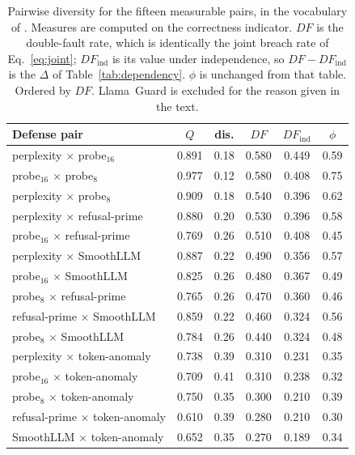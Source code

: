 \begin{table}[t]
\centering
\caption{Pairwise diversity for the fifteen measurable pairs, in the vocabulary of
\citet{kuncheva2003measures}. Measures are computed on the correctness indicator. $DF$ is
the double-fault rate, which is identically the joint breach rate of Eq.~\eqref{eq:joint};
$DF_{\mathrm{ind}}$ is its value under independence, so $DF-DF_{\mathrm{ind}}$ is the
$\Delta$ of Table~\ref{tab:dependency}. $\phi$ is unchanged from that table. Ordered by
$DF$. Llama~Guard is excluded for the reason given in the text.}
\label{tab:fusion}
\begin{tabular}{lccccc}
\toprule
Defense pair & $Q$ & dis. & $DF$ & $DF_{\mathrm{ind}}$ & $\phi$ \\
\midrule
perplexity $\times$ probe$_{16}$      & 0.891 & 0.18 & 0.580 & 0.449 & 0.59 \\
probe$_{16}$ $\times$ probe$_{8}$     & 0.977 & 0.12 & 0.580 & 0.408 & 0.75 \\
perplexity $\times$ probe$_{8}$       & 0.909 & 0.18 & 0.540 & 0.396 & 0.62 \\
perplexity $\times$ refusal-prime     & 0.880 & 0.20 & 0.530 & 0.396 & 0.58 \\
probe$_{16}$ $\times$ refusal-prime   & 0.769 & 0.26 & 0.510 & 0.408 & 0.45 \\
perplexity $\times$ SmoothLLM         & 0.887 & 0.22 & 0.490 & 0.356 & 0.57 \\
probe$_{16}$ $\times$ SmoothLLM       & 0.825 & 0.26 & 0.480 & 0.367 & 0.49 \\
probe$_{8}$ $\times$ refusal-prime    & 0.765 & 0.26 & 0.470 & 0.360 & 0.46 \\
refusal-prime $\times$ SmoothLLM      & 0.859 & 0.22 & 0.460 & 0.324 & 0.56 \\
probe$_{8}$ $\times$ SmoothLLM        & 0.784 & 0.26 & 0.440 & 0.324 & 0.48 \\
perplexity $\times$ token-anomaly     & 0.738 & 0.39 & 0.310 & 0.231 & 0.35 \\
probe$_{16}$ $\times$ token-anomaly   & 0.709 & 0.41 & 0.310 & 0.238 & 0.32 \\
probe$_{8}$ $\times$ token-anomaly    & 0.750 & 0.35 & 0.300 & 0.210 & 0.39 \\
refusal-prime $\times$ token-anomaly  & 0.610 & 0.39 & 0.280 & 0.210 & 0.30 \\
SmoothLLM $\times$ token-anomaly      & 0.652 & 0.35 & 0.270 & 0.189 & 0.34 \\
\bottomrule
\end{tabular}
\end{table}

